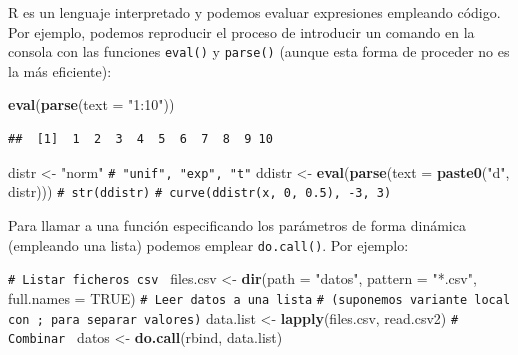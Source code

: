 \documentclass[
]{book}
\newenvironment{Shaded}{\begin{snugshade}}{\end{snugshade}}
\newcommand{\AttributeTok}[1]{\textcolor[rgb]{0.13,0.29,0.53}{#1}}
\newcommand{\CommentTok}[1]{\textcolor[rgb]{0.56,0.35,0.01}{\textit{#1}}}
\newcommand{\ConstantTok}[1]{\textcolor[rgb]{0.56,0.35,0.01}{#1}}
\newcommand{\FunctionTok}[1]{\textcolor[rgb]{0.13,0.29,0.53}{\textbf{#1}}}
\newcommand{\NormalTok}[1]{#1}
\newcommand{\OtherTok}[1]{\textcolor[rgb]{0.56,0.35,0.01}{#1}}
\newcommand{\StringTok}[1]{\textcolor[rgb]{0.31,0.60,0.02}{#1}}
\theoremstyle{break}
\theoremstyle{nonumberplain}
\renewcommand{\CommentTok}[1]{\textcolor[rgb]{0.41,0.41,0.41}{\texttt{#1}}}
\begin{document}
R es un lenguaje interpretado y podemos evaluar expresiones empleando código.
Por ejemplo, podemos reproducir el proceso de introducir un comando en la consola con las funciones \texttt{eval()} y \texttt{parse()} (aunque esta forma de proceder no es la más eficiente):

\begin{Shaded}
\begin{Highlighting}[]
\FunctionTok{eval}\NormalTok{(}\FunctionTok{parse}\NormalTok{(}\AttributeTok{text =} \StringTok{"1:10"}\NormalTok{))}
\end{Highlighting}
\end{Shaded}

\begin{verbatim}
##  [1]  1  2  3  4  5  6  7  8  9 10
\end{verbatim}

\begin{Shaded}
\begin{Highlighting}[]
\NormalTok{distr }\OtherTok{\textless{}{-}} \StringTok{"norm"}  \CommentTok{\# "unif", "exp", "t"}
\NormalTok{ddistr }\OtherTok{\textless{}{-}} \FunctionTok{eval}\NormalTok{(}\FunctionTok{parse}\NormalTok{(}\AttributeTok{text =} \FunctionTok{paste0}\NormalTok{(}\StringTok{"d"}\NormalTok{, distr)))}
\CommentTok{\# str(ddistr)}
\CommentTok{\# curve(ddistr(x, 0, 0.5), {-}3, 3)}
\end{Highlighting}
\end{Shaded}

Para llamar a una función especificando los parámetros de forma dinámica (empleando una lista) podemos emplear \texttt{do.call()}.
Por ejemplo:

\begin{Shaded}
\begin{Highlighting}[]
\CommentTok{\# Listar ficheros csv }
\NormalTok{files.csv }\OtherTok{\textless{}{-}} \FunctionTok{dir}\NormalTok{(}\AttributeTok{path =} \StringTok{"datos"}\NormalTok{, }\AttributeTok{pattern =} \StringTok{"*.csv"}\NormalTok{, }\AttributeTok{full.names =} \ConstantTok{TRUE}\NormalTok{)}
\CommentTok{\# Leer datos a una lista}
\CommentTok{\# (suponemos variante local con ; para separar valores)}
\NormalTok{data.list }\OtherTok{\textless{}{-}} \FunctionTok{lapply}\NormalTok{(files.csv, read.csv2)}
\CommentTok{\# Combinar }
\NormalTok{datos }\OtherTok{\textless{}{-}} \FunctionTok{do.call}\NormalTok{(}\StringTok{\textquotesingle{}rbind\textquotesingle{}}\NormalTok{, data.list)}
\end{Highlighting}
\end{Shaded}
\end{document}
